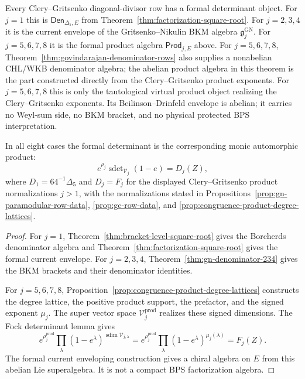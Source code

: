 \documentclass[11pt]{memoir}
\newcommand{\sdim}{\operatorname{sdim}}
\newcommand{\sdet}{\operatorname{sdet}}
\begin{document}
\begin{theorem}
\label{thm:eight-formal-current-rows}
Every Clery--Gritsenko diagonal-divisor row has a formal determinant
object.  For $j=1$ this is
$\mathsf{Den}_{\Delta_5,E}$ from
Theorem~\ref{thm:factorization-square-root}.  For $j=2,3,4$ it is the
current envelope of the Gritsenko--Nikulin BKM algebra
$\mathfrak g_j^{\mathrm{GN}}$.  For $j=5,6,7,8$ it is the formal
product algebra $\mathsf{Prod}_{j,E}$ above.
For $j=5,6,7,8$, Theorem~\ref{thm:govindarajan-denominator-rows}
also supplies a nonabelian CHL/WKB denominator algebra; the abelian
product algebra in this theorem is the part constructed directly from
the Clery--Gritsenko product exponents.
For $j=5,6,7,8$ this is only the tautological virtual product object
realizing the Clery--Gritsenko exponents.  Its Beilinson--Drinfeld
envelope is abelian; it carries no Weyl-sum side, no BKM bracket, and no
physical protected BPS interpretation.

In all eight cases the formal determinant is the corresponding monic
automorphic product:
$$
e^{\rho_j}\sdet_{\mathcal V_j}(1-e)
=D_j(Z),
$$
where $D_1=64^{-1}\Delta_5$ and $D_j=F_j$ for the displayed
Clery--Gritsenko product normalizations $j>1$,
with the normalizations stated in
Propositions~\ref{prop:gn-paramodular-row-data},
\ref{prop:gc-row-data}, and
\ref{prop:congruence-product-degree-lattices}.
\end{theorem}

\begin{proof}
For $j=1$, Theorem~\ref{thm:bracket-level-square-root} gives the
Borcherds denominator algebra and Theorem~\ref{thm:factorization-square-root} gives
the formal current envelope.  For $j=2,3,4$,
Theorem~\ref{thm:gn-denominator-234} gives the BKM brackets and their
denominator identities.

For $j=5,6,7,8$, Proposition~\ref{prop:congruence-product-degree-lattices}
constructs the degree lattice, the positive product support, the
prefactor, and the signed exponent $\mu_j$.  The super vector space
$\mathcal V_j^{\mathrm{prod}}$ realizes these signed dimensions.  The
Fock determinant lemma gives
$$
e^{\rho_j^{\mathrm{prod}}}
\prod_\lambda(1-e^\lambda)^{\sdim\mathcal V_{j,\lambda}}
=
e^{\rho_j^{\mathrm{prod}}}
\prod_\lambda(1-e^\lambda)^{\mu_j(\lambda)}
=F_j(Z).
$$
The formal current enveloping construction gives a chiral algebra on
\(E\) from this abelian Lie superalgebra.  It is not a compact BPS
factorization algebra.
\end{proof}
\end{document}
